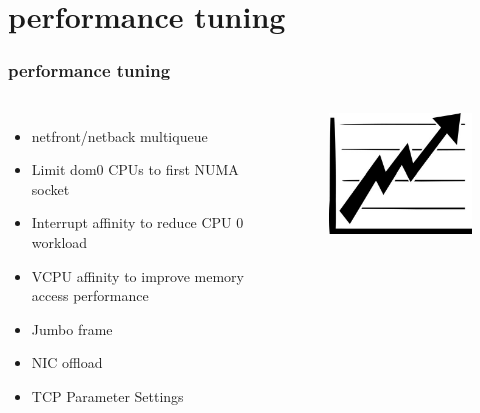 \documentclass[aspectratio=169]{beamer}
\begin{document}
\section{performance tuning}
\begin{frame}
\frametitle{performance tuning}
\begin{columns}[c]
\begin{itemize}
\item netfront/netback multiqueue
\item Limit dom0 CPUs to first NUMA socket
\item Interrupt affinity to reduce CPU 0 workload
\item VCPU affinity to improve memory access performance
\item Jumbo frame
\item NIC offload
\item TCP Parameter Settings
\end{itemize}
\begin{center}
\begin{figure}
\includegraphics[width=.8\linewidth]{figures/performance.pdf}
\end{figure}
\end{center}
\end{columns}
\end{frame}

\end{document}
